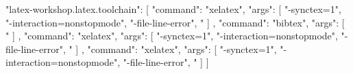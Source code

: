 "latex-workshop.latex.toolchain": [
    {
        "command": "xelatex",
        "args": [
            "-synctex=1",
            "-interaction=nonstopmode",
            "-file-line-error",
            "%
        ]
    }, {
        "command": "bibtex",
        "args": [
            "%
        ]
    }, {
        "command": "xelatex",
        "args": [
            "-synctex=1",
            "-interaction=nonstopmode",
            "-file-line-error",
            "%
        ]
    }, {
        "command": "xelatex",
        "args": [
            "-synctex=1",
            "-interaction=nonstopmode",
            "-file-line-error",
            "%
        ]
    }
]